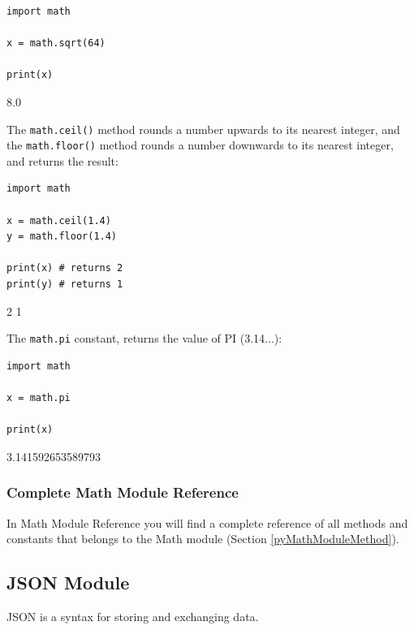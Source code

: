 \documentclass[12pt,a4paper]{article}
\newcommand{\code}[1]{%
	\colorbox{backcolour}{\lstinline{#1}}%
}
\begin{document}
\begin{ebox}
	\begin{lstlisting}
import math

x = math.sqrt(64)

print(x)
	\end{lstlisting}
\tcblower
	\begin{vercode}
8.0
	\end{vercode}
\end{ebox}

The \code{math.ceil()} method rounds a number upwards to its nearest
integer, and the \code{math.floor()} method rounds a number downwards to
its nearest integer, and returns the result:

\begin{ebox}
	\begin{lstlisting}
import math

x = math.ceil(1.4)
y = math.floor(1.4)

print(x) # returns 2
print(y) # returns 1
	\end{lstlisting}
\tcblower
	\begin{vercode}
2
1
	\end{vercode}
\end{ebox}

The \code{math.pi} constant, returns the value of PI (3.14...):

\begin{ebox}
	\begin{lstlisting}
import math

x = math.pi

print(x)
	\end{lstlisting}
\tcblower
	\begin{vercode}
3.141592653589793
	\end{vercode}
\end{ebox}
\subsubsection{Complete Math Module Reference}

In Math Module Reference you will find a complete reference of all
methods and constants that belongs to the Math module (Section \ref{pyMathModuleMethod}).
\subsection{JSON Module}

JSON is a syntax for storing and exchanging data.
\end{document}
